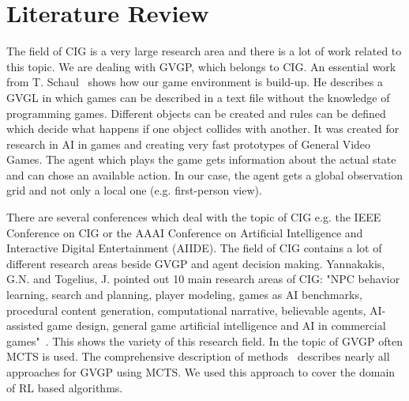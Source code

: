 \section{Literature Review} 
\label{sec:lit}

The field of \ac{CIG} is a very large research area and there is a lot of work related to this topic. We are dealing with \ac{GVGP}, which belongs to \ac{CIG}. 
An essential work from T. Schaul~\cite{schaul2013pyvgdl} shows how our game environment is build-up. He describes a \ac{GVGL} in which games can be described in a text file without the knowledge of programming games. Different objects can be created and rules can be defined which decide what happens if one object collides with another. It was created for research in \ac{AI} in games and creating very fast prototypes of General Video Games. The agent which plays the game gets information about the actual state and can chose an available action. In our case, the agent gets a global observation grid and not only a local one (e.g. first-person view). 

There are several conferences which deal with the topic of \ac{CIG} e.g. the IEEE Conference on \ac{CIG} or the AAAI Conference on Artificial Intelligence and Interactive Digital Entertainment (AIIDE). The field of \ac{CIG} contains a lot of different research areas beside \ac{GVGP} and agent decision making. Yannakakis, G.N. and Togelius, J. pointed out 10 main research areas of \ac{CIG}: "NPC behavior learning, search and planning, player modeling, games as AI benchmarks, procedural content generation, computational narrative, believable agents, AI-assisted game design, general game artificial intelligence and AI in commercial games"~\cite{panorama}.
This shows the variety of this research field. In the topic of \ac{GVGP} often \ac{MCTS} is used. The comprehensive description of methods~\cite{BrowneMCTSurvey} describes nearly all approaches for \ac{GVGP} using \ac{MCTS}. We used this approach to cover the domain of \ac{RL} based algorithms.